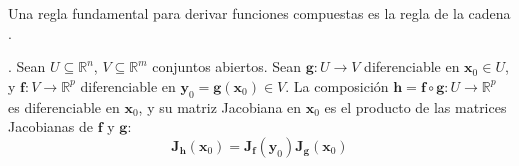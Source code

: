 Una regla fundamental para derivar funciones compuestas es la regla de la cadena \citep{Apostol1974, Rudin1976}.

\begin{theorem} \citep{Apostol1974}.
\label{thm:chain_rule_general}
Sean $U \subseteq \mathbb{R}^n$, $V \subseteq \mathbb{R}^m$ conjuntos abiertos. Sean $\mathbf{g}: U \to V$ diferenciable en $\mathbf{x}_0 \in U$, y $\mathbf{f}: V \to \mathbb{R}^p$ diferenciable en $\mathbf{y}_0 = \mathbf{g}(\mathbf{x}_0) \in V$. La composición $\mathbf{h} = \mathbf{f} \circ \mathbf{g}: U \to \mathbb{R}^p$ es diferenciable en $\mathbf{x}_0$, y su matriz Jacobiana en $\mathbf{x}_0$ es el producto de las matrices Jacobianas de $\mathbf{f}$ y $\mathbf{g}$:
\[ \mathbf{J}_{\mathbf{h}}(\mathbf{x}_0) = \mathbf{J}_{\mathbf{f}}(\mathbf{y}_0) \mathbf{J}_{\mathbf{g}}(\mathbf{x}_0) \]
\end{theorem}

